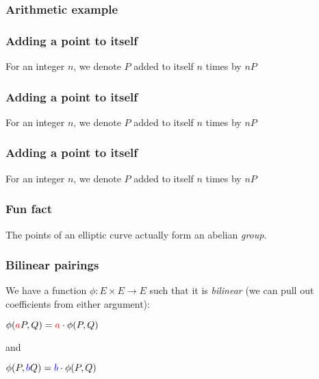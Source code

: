 \documentclass{beamer} %
\theoremstyle{definition} %
\begin{document}
\begin{frame}

\frametitle{Arithmetic example}

\begin{center}
\end{center}

\end{frame}

\begin{frame}

\frametitle{Adding a point to itself}

\begin{center}
For an integer $n$, we denote $P$ added to itself $n$ times by $nP$

\end{center}

\end{frame}

\begin{frame}

\frametitle{Adding a point to itself}

\begin{center}
For an integer $n$, we denote $P$ added to itself $n$ times by $nP$

\end{center}

\end{frame}

\begin{frame}

\frametitle{Adding a point to itself}

\begin{center}
For an integer $n$, we denote $P$ added to itself $n$ times by $nP$

\end{center}

\end{frame}

\begin{frame}

\frametitle{Fun fact}

The points of an elliptic curve actually form an abelian \emph{group}.

\end{frame}

\begin{frame}

\frametitle{Bilinear pairings}

We have a function $\phi: E \times E \to E$ such that it is \emph{bilinear} (we can pull out coefficients from either argument):

\begin{center}
$\phi(\textcolor{red}{a}P,Q) = \textcolor{red}{a}\cdot\phi(P,Q)$ 

and 

$\phi(P,\textcolor{blue}{b}Q) = \textcolor{blue}{b}\cdot\phi(P,Q)$
\end{center}

\end{frame}
\end{document}

